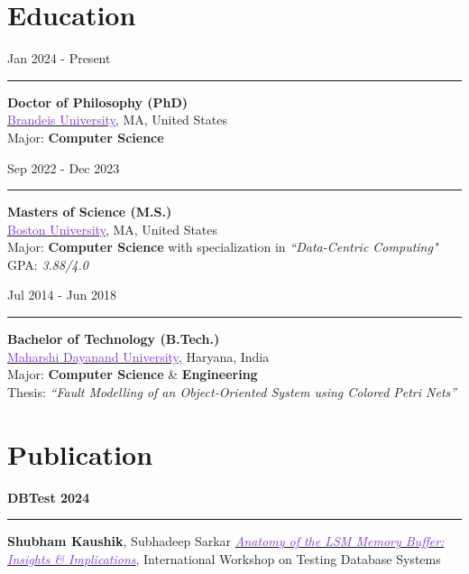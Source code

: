 \documentclass[10pt,a4paper,calibri]{moderncv}
\newcommand{\beforesection}{\vspace{-0.5em}}
\newcommand{\mediumspace}{\vspace{0.5em}}
\newcommand{\education}[2]{
  \noindent
  \begin{minipage}[c]{0.20\textwidth}
    \hfill
    #1
  \end{minipage}%
  \hspace{0.01\textwidth}
  \begin{minipage}[c]{0.02\textwidth}
    \textcolor{lightgray}{\rule{1pt}{1.6cm}}
  \end{minipage}%
  \begin{minipage}[c]{0.80\textwidth}
    \raggedright{
    #2
    }
  \end{minipage}%
}
\newcommand{\publications}[2]{
  \noindent
  \begin{minipage}[c]{0.15\textwidth}
    \centering
      \textbf{#1}
  \end{minipage}%
  \hspace{0.01\textwidth}
  \begin{minipage}[c]{0.02\textwidth}
    \textcolor{lightgray}{\rule{1pt}{0.75cm}}
  \end{minipage}%
  \begin{minipage}[c]{0.80\textwidth}
    \raggedright{
    #2
    }
  \end{minipage}%
}
\begin{document}
\section{Education}
\noindent
\begin{minipage}[c]{0.20\textwidth}
  \hfill
  Jan 2024 \-- Present
\end{minipage}%
\hspace{0.01\textwidth}
\begin{minipage}[c]{0.02\textwidth}
  \textcolor{lightgray}{\rule{1pt}{1.2cm}}
\end{minipage}%
\begin{minipage}[c]{0.80\textwidth}
  \raggedright{
    \textbf{Doctor of Philosophy (PhD)}\\
    \href{https://www.brandeis.edu/}{\textcolor{blueviolet}{Brandeis University}}, MA, United States\\
    Major: \textbf{Computer Science}\\
  }
\end{minipage}%

\mediumspace

\education{Sep 2022 \-- Dec 2023}
{
  \textbf{Masters of Science (M.S.)}\\
  \href{https://www.bu.edu/}{\textcolor{blueviolet}{Boston University}}, MA, United States\\
  Major: \textbf{Computer Science} with specialization in \textit{“Data-Centric Computing"}\\
  GPA: \textit{3.88/4.0}
}

\mediumspace

\education{Jul 2014 \-- Jun 2018}
{
  \textbf{Bachelor of Technology (B.Tech.)}\\
  \href{https://mdu.ac.in/}{\textcolor{blueviolet}{Maharshi Dayanand University}}, Haryana, India\\
  Major: \textbf{Computer Science} \& \textbf{Engineering}\\
  Thesis: \textit{“Fault Modelling of an Object-Oriented System using Colored Petri Nets”}\\
}

\beforesection

\section{Publication}
\publications{DBTest 2024}{\textbf{Shubham Kaushik}, Subhadeep Sarkar \href{https://doi.org/10.1145/3662165.3662766}{\textit{\textcolor{blueviolet}{Anatomy 
of the LSM Memory Buffer: Insights \& Implications}}}, International Workshop on Testing Database Systems}
\end{document}
